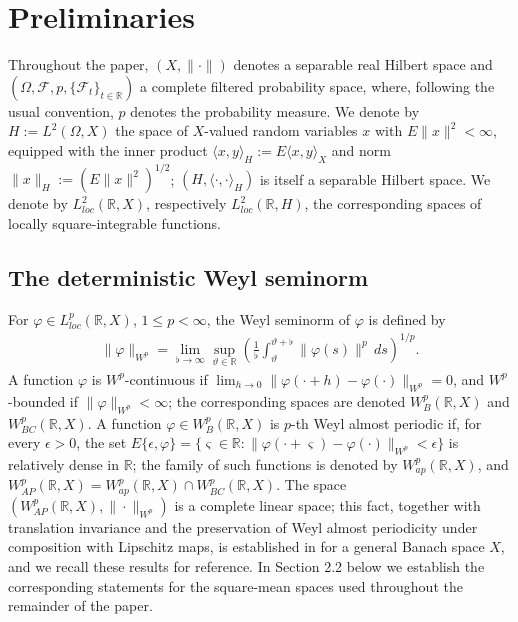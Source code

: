 \documentclass[11pt]{amsart}
\begin{document}
\section{Preliminaries}

Throughout the paper, $(X,\|\cdot\|)$ denotes a separable real Hilbert space and $(\Omega,\mathcal F,p,\{\mathcal F_t\}_{t\in\mathbb R})$ a complete filtered probability space, where, following the usual convention, $p$ denotes the probability measure. We denote by $H:=L^2(\Omega,X)$ the space of $X$-valued random variables $x$ with $E\|x\|^2<\infty$, equipped with the inner product $\langle x,y\rangle_H:=E\langle x,y\rangle_X$ and norm $\|x\|_H:=(E\|x\|^2)^{1/2}$; $(H,\langle\cdot,\cdot\rangle_H)$ is itself a separable Hilbert space. We denote by $L^2_{loc}(\mathbb R,X)$, respectively $L^2_{loc}(\mathbb R,H)$, the corresponding spaces of locally square-integrable functions.

\subsection{The deterministic Weyl seminorm}

For $\varphi\in L^p_{loc}(\mathbb R,X)$, $1\le p<\infty$, the Weyl seminorm of $\varphi$ is defined by
\begin{align*}
\|\varphi\|_{W^p}=\lim_{\flat\to\infty}\sup_{\vartheta\in\mathbb R}\left(\frac1\flat\int_{\vartheta}^{\vartheta+\flat}\|\varphi(s)\|^p\,ds\right)^{1/p}.
\end{align*}
A function $\varphi$ is $W^p$-continuous if $\lim_{h\to0}\|\varphi(\cdot+h)-\varphi(\cdot)\|_{W^p}=0$, and $W^p$-bounded if $\|\varphi\|_{W^p}<\infty$; the corresponding spaces are denoted $W^p_{B}(\mathbb R,X)$ and $W^p_{BC}(\mathbb R,X)$. A function $\varphi\in W^p_{B}(\mathbb R,X)$ is $p$-th Weyl almost periodic if, for every $\epsilon>0$, the set $E\{\epsilon,\varphi\}=\{\varsigma\in\mathbb R:\|\varphi(\cdot+\varsigma)-\varphi(\cdot)\|_{W^p}<\epsilon\}$ is relatively dense in $\mathbb R$; the family of such functions is denoted by $W^p_{ap}(\mathbb R,X)$, and $W^p_{AP}(\mathbb R,X)=W^p_{ap}(\mathbb R,X)\cap W^p_{BC}(\mathbb R,X)$. The space $(W^p_{AP}(\mathbb R,X),\|\cdot\|_{W^p})$ is a complete linear space; this fact, together with translation invariance and the preservation of Weyl almost periodicity under composition with Lipschitz maps, is established in \cite[Section 2]{LiWeyl} for a general Banach space $X$, and we recall these results for reference. In Section 2.2 below we establish the corresponding statements for the square-mean spaces used throughout the remainder of the paper.
\end{document}
